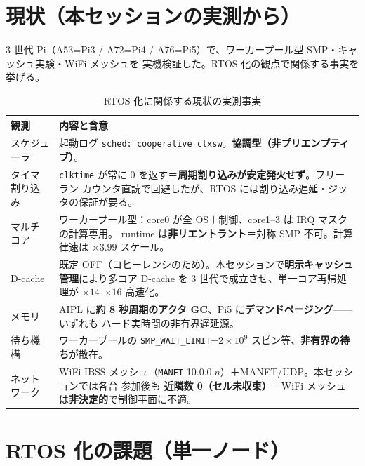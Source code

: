 \documentclass[11pt,a4paper]{article}
\newcommand{\code}[1]{\texttt{#1}}
\newcommand{\prob}[1]{\textbf{\textcolor{red!55!black}{#1}}}
\begin{document}
\section{現状（本セッションの実測から）}
\label{sec:now}

3 世代 Pi（A53=Pi3 / A72=Pi4 / A76=Pi5）で、ワーカープール型 SMP・キャッシュ実験・WiFi メッシュを
実機検証した。RTOS 化の観点で関係する事実を挙げる。

\begin{table}[htbp]\centering
\caption{RTOS 化に関係する現状の実測事実}
\small
\begin{tabularx}{\textwidth}{@{}lX@{}}
\toprule
観測 & 内容と含意 \\
\midrule
スケジューラ & 起動ログ \code{sched: cooperative ctxsw}。\prob{協調型（非プリエンプティブ）}。 \\
タイマ割り込み & \code{clktime} が常に 0 を返す＝\prob{周期割り込みが安定発火せず}。フリーラン
  カウンタ直読で回避したが、RTOS には割り込み遅延・ジッタの保証が要る。 \\
マルチコア & ワーカープール型：core0 が全 OS＋制御、core1--3 は IRQ マスクの計算専用。
  runtime は\prob{非リエントラント}＝対称 SMP 不可。計算律速は \(\times 3.99\) スケール。 \\
D-cache & 既定 OFF（コヒーレンシのため）。本セッションで\textbf{明示キャッシュ管理}により多コア
  D-cache を 3 世代で成立させ、単一コア再帰処理が \(\times 14\)--\(\times 16\) 高速化。 \\
メモリ & AIPL に\prob{約 8 秒周期のアクタ GC}、Pi5 に\prob{デマンドページング}——いずれも
  ハード実時間の非有界遅延源。 \\
待ち機構 & ワーカープールの \code{SMP\_WAIT\_LIMIT}=\(2\times10^9\) スピン等、\prob{非有界の待ち}が散在。 \\
ネットワーク & WiFi IBSS メッシュ（\code{MANET} 10.0.0.$n$）＋MANET/UDP。本セッションでは各台
  参加後も \prob{近隣数 0（セル未収束）}＝WiFi メッシュは\textbf{非決定的}で制御平面に不適。 \\
\bottomrule
\end{tabularx}
\end{table}

\section{RTOS 化の課題（単一ノード）}
\label{sec:rtos}
\end{document}
